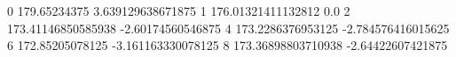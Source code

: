 0 179.65234375 3.639129638671875
1 176.01321411132812 0.0
2 173.41146850585938 -2.60174560546875
4 173.2286376953125 -2.784576416015625
6 172.85205078125 -3.161163330078125
8 173.36898803710938 -2.64422607421875
